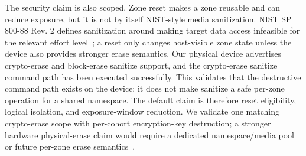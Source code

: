 The security claim is also scoped.  Zone reset makes a zone reusable and can reduce exposure, but it is not by itself NIST-style media sanitization.  NIST SP 800-88 Rev. 2 defines sanitization around making target data access infeasible for the relevant effort level~\cite{nist-sp80088r2}; a \zns reset only changes host-visible zone state unless the device also provides stronger erase semantics.  Our physical device advertises crypto-erase and block-erase sanitize support, and the crypto-erase sanitize command path has been executed successfully.  This validates that the destructive command path exists on the device; it does not make sanitize a safe per-zone operation for a shared namespace.  The default claim is therefore reset eligibility, logical isolation, and exposure-window reduction.  We validate one matching crypto-erase scope with per-cohort encryption-key destruction; a stronger hardware physical-erase claim would require a dedicated namespace/media pool or future per-zone erase semantics~\cite{nvme-sanitize}.
